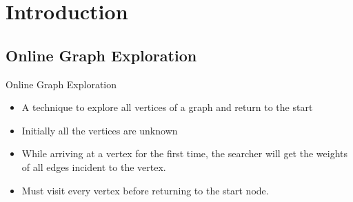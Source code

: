 \documentclass{beamer}
\begin{document}
\section{Introduction}
\subsection{Online Graph Exploration}
\begin{frame}{Online Graph Exploration}
    \begin{itemize}
        \item A technique to explore all vertices of a graph and return to the start \pause
        \item Initially all the vertices are unknown \pause
        \item While arriving at a vertex for the first time, the searcher will get the weights of all edges incident to the vertex.\pause
        \item Must visit every vertex before returning to the start node.
    \end{itemize}
\end{frame}
% 
% 
\end{document}
